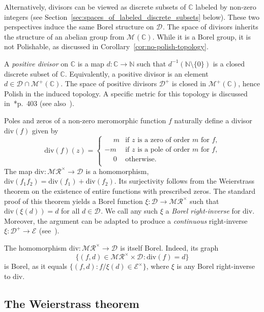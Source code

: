 \documentclass[12pt]{paper}
\numberwithin{equation}{section}
\theoremstyle{plain}
\theoremstyle{definition}
\newcommand{\C}{\mathbb{C}}
\newcommand{\N}{\mathbb{N}}
\newcommand{\meas}[2][]{\mathcal{M}_{#1}(#2)}
\newcommand{\measp}[2][]{\mathcal{M}_{#1}^+(#2)}
\newcommand{\merom}[1][]{\mathcal{MR}_{#1}}
\newcommand{\meromnz}{\merom^{\times}}
\newcommand{\holomnz}[1][]{\mathcal{E}^{\times}_{#1}}
\newcommand{\holom}[1][]{\mathcal{E}_{#1}}
\newcommand{\divis}[1][]{\mathcal{D}_{#1}}
\newcommand{\divisp}[1][]{\divis[#1]^{+}}
\newcommand{\dm}{\mathrm{div}}      %
\begin{document}
Alternatively, divisors can be viewed as discrete subsets of \(\C\) labeled by non-zero integers
(see Section~\ref{sec:spaces_of_labeled_discrete_subsets} below).  These two perspectives induce the
same Borel structure on \(\divis\).  The space of divisors inherits the structure of an abelian
group from \(\meas{\C}\).  While it is a Borel group, it is not Polishable, as discussed in
Corollary~\ref{cor:no-polish-topology}.

A \emph{positive divisor} on \(\C\) is a map \(d : \C \to \N\) such that
\(d^{-1}(\N \setminus \{0\})\) is a closed discrete subset of \(\C\).  Equivalently, a positive
divisor is an element \(d \in \divis \cap \measp{\C}\).  The space of positive divisors \(\divisp\)
is closed in \(\measp{\C}\), hence Polish in the induced topology.  A specific metric for this
topology is discussed in~\cite{daleyIntroductionTheoryPoint2003}*{p.~403} (see
also~\cite{morariu-patrichiWeakHashMetricBoundednly2018}).

Poles and zeros of a non-zero meromorphic function \(f\) naturally define a divisor \(\dm(f)\) given
by
\[\dm(f)(z) =
  \begin{cases}
    \phantom{-}m  & \textrm{if \(z\) is a zero of order \(m\) for \(f\),} \\
    - m  & \textrm{if \(z\) is a pole of order \(m\) for \(f\),} \\
    \phantom{-}0  & \textrm{otherwise.} \\
  \end{cases}
\]
The map \(\dm : \meromnz \to \divis\) is a homomorphism,
\(\dm(f_{1}f_{2}) = \dm(f_{1}) + \dm(f_{2})\). Its surjectivity follows from the Weierstrass theorem
on the existence of entire functions with prescribed zeros.  The standard proof of this theorem
yields a Borel function \(\xi : \divis \to \meromnz\) such that \(\dm(\xi(d)) = d\) for all
\(d \in \divis\).  We call any such \(\xi\) a \emph{Borel right-inverse} for \(\dm\).  Moreover, the
argument can be adapted to produce a \emph{continuous} right-inverse \(\xi : \divisp \to \holom\)
(see~\cite{201919}).

The homomorphism \(\dm : \meromnz \to \divis\) is itself Borel.  Indeed, its graph
\[\{(f,d) \in \meromnz \times \divis : \dm(f) = d\}\]
is Borel, as it equals \(\{(f,d) : f/\xi(d) \in \holomnz\}\), where \(\xi\) is any Borel
right-inverse to \(\dm\).


\subsection{The Weierstrass theorem}
\label{sec:weierstr-mitt-leffl}
\end{document}
